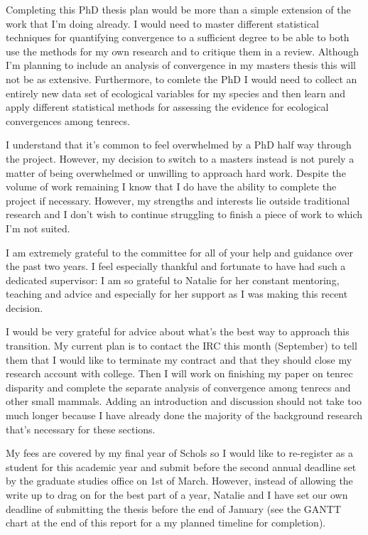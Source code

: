 \documentclass[12pt,a4paper]{article}
\begin{document}
	Completing this PhD thesis plan would be more than a simple extension of the work that I'm doing already. I would need to master different statistical techniques for quantifying convergence to a sufficient degree to be able to both use the methods for my own research and to critique them in a review. Although I'm planning to include an analysis of convergence in my masters thesis this will not be as extensive. Furthermore, to comlete the PhD I would need to collect an entirely new data set of ecological variables for my species and then learn and apply different statistical methods for assessing the evidence for ecological convergences among tenrecs.

	I understand that it's common to feel overwhelmed by a PhD half way through the project. However, my decision to switch to a masters instead is not purely a matter of being overwhelmed or unwilling to approach hard work. Despite the volume of work remaining I know that I do have the ability to complete the project if necessary. However, my strengths and interests lie outside traditional research and I don't wish to continue struggling to finish a piece of work to which I'm not suited.

	I am extremely grateful to the committee for all of your help and guidance over the past two years. I feel especially thankful and fortunate to have had such a dedicated supervisor: I am so grateful to Natalie for her constant mentoring, teaching and advice and especially for her support as I was making this recent decision.   

	I would be very grateful for advice about what's the best way to approach this transition. My current plan is to contact the IRC this month (September) to tell them that I would like to terminate my contract and that they should close my research account with college.  Then I will work on finishing my paper on tenrec disparity and complete the separate analysis of convergence among tenrecs and other small mammals. Adding an introduction and discussion should not take too much longer because I have already done the majority of the background research that's necessary for these sections.

	My fees are covered by my final year of Schols so I would like to re-register as a student for this academic year and submit before the second annual deadline set by the graduate studies office on 1st of March. However, instead of allowing the write up to drag on for the best part of a year, Natalie and I have set our own deadline of submitting the thesis before the end of January (see the GANTT chart at the end of this report for a my planned timeline for completion).
 
\end{document}

